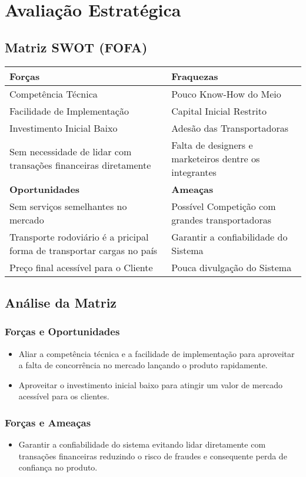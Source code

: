 \chapter{Avaliação Estratégica}

\section{Matriz SWOT (FOFA)}
  \begin{tabular}{|p{8.0cm}|p{8.0cm}|}
  \hline
   \textbf{Forças} & \textbf{Fraquezas}\\ \hline
    Competência Técnica & Pouco Know-How do Meio \\ \hline
   Facilidade de Implementação & Capital Inicial Restrito \\ \hline
   Investimento Inicial Baixo & Adesão das Transportadoras\\ \hline
   Sem necessidade de lidar com transações financeiras diretamente &  Falta de designers e marketeiros dentre os integrantes \\ \hline
    \textbf{Oportunidades} & \textbf{Ameaças}\\ \hline
Sem serviços semelhantes no mercado & Possível Competição com grandes transportadoras\\ \hline
Transporte rodoviário é a pricipal  forma de transportar cargas no país & Garantir a confiabilidade do Sistema \\ \hline
   Preço final acessível para o Cliente & Pouca divulgação do Sistema\\ \hline
  \end{tabular}
 \section{Análise da Matriz}
 
\subsection{Forças e Oportunidades}
\begin{itemize}
 \item Aliar a competência técnica e a facilidade de implementação para aproveitar a falta de
concorrência no mercado lançando o produto rapidamente.
 \item Aproveitar o investimento inicial baixo para atingir um valor de mercado acessível para os clientes.
\end{itemize}
\subsection{Forças e Ameaças}
\begin{itemize}
\item Garantir a confiabilidade do sistema evitando lidar diretamente com transações financeiras reduzindo o risco de fraudes e consequente perda de confiança no produto.
\end{itemize}
